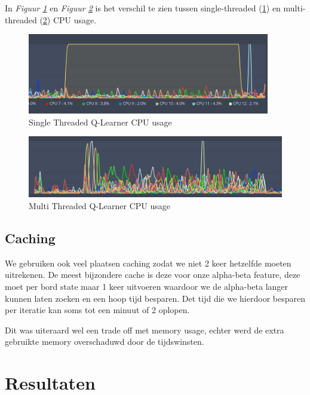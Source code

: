 \documentclass[a4paper,openany]{uantwerpenassignment}
\newcommand{\figref}[1]{\textit{Figuur \ref{#1}}}
\begin{document}
In \figref{fig:singlethreaded} en \figref{fig:multithreaded} is het verschil te zien tussen single-threaded \tiny(\ref{fig:singlethreaded})\small{ }en multi-threaded \tiny(\ref{fig:multithreaded})\small{ }CPU usage.

\begin{figure}[h]
    \centering
    \includegraphics[width=300pt]{images/singlethreaded.png}
    \caption{Single Threaded Q-Learner CPU usage}
    \label{fig:singlethreaded}
\end{figure}

\begin{figure}[h]
    \centering
    \includegraphics[width=350pt]{images/multithreaded.png}
    \caption{Multi Threaded Q-Learner CPU usage}
    \label{fig:multithreaded}
\end{figure}

\section{Caching}
\label{caching}

We gebruiken ook veel plaatsen caching zodat we niet 2 keer hetzelfde moeten uitrekenen. De meest bijzondere cache is deze voor onze alpha-beta feature, deze moet per bord state maar 1 keer uitvoeren waardoor we de alpha-beta langer kunnen laten zoeken en een hoop tijd besparen.
Det tijd die we hierdoor besparen per iteratie kan soms tot een minuut of 2 oplopen.

Dit was uiteraard wel een trade off met memory usage, echter werd de extra gebruikte memory overschaduwd door de tijdswinsten.

\chapter{Resultaten}
\end{document}
